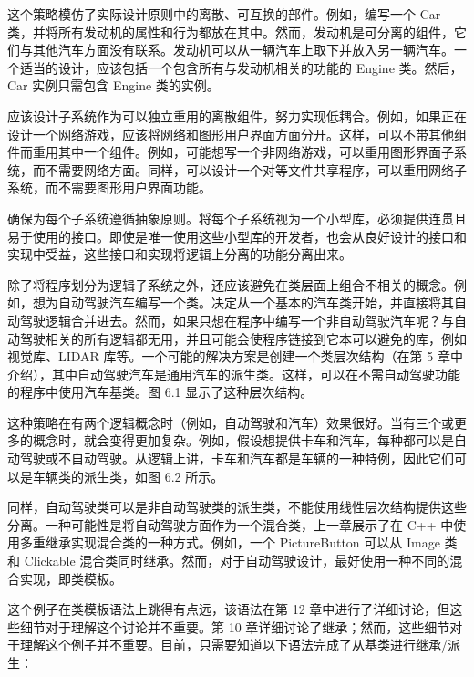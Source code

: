 这个策略模仿了实际设计原则中的离散、可互换的部件。例如，编写一个 Car 类，并将所有发动机的属性和行为都放在其中。然而，发动机是可分离的组件，它们与其他汽车方面没有联系。发动机可以从一辆汽车上取下并放入另一辆汽车。一个适当的设计，应该包括一个包含所有与发动机相关的功能的 Engine 类。然后，Car 实例只需包含 Engine 类的实例。


应该设计子系统作为可以独立重用的离散组件，努力实现低耦合。例如，如果正在设计一个网络游戏，应该将网络和图形用户界面方面分开。这样，可以不带其他组件而重用其中一个组件。例如，可能想写一个非网络游戏，可以重用图形界面子系统，而不需要网络方面。同样，可以设计一个对等文件共享程序，可以重用网络子系统，而不需要图形用户界面功能。

确保为每个子系统遵循抽象原则。将每个子系统视为一个小型库，必须提供连贯且易于使用的接口。即使是唯一使用这些小型库的开发者，也会从良好设计的接口和实现中受益，这些接口和实现将逻辑上分离的功能分离出来。


除了将程序划分为逻辑子系统之外，还应该避免在类层面上组合不相关的概念。例如，想为自动驾驶汽车编写一个类。决定从一个基本的汽车类开始，并直接将其自动驾驶逻辑合并进去。然而，如果只想在程序中编写一个非自动驾驶汽车呢？与自动驾驶相关的所有逻辑都无用，并且可能会使程序链接到它本可以避免的库，例如视觉库、LIDAR 库等。一个可能的解决方案是创建一个类层次结构（在第 5 章中介绍），其中自动驾驶汽车是通用汽车的派生类。这样，可以在不需自动驾驶功能的程序中使用汽车基类。图 6.1 显示了这种层次结构。


这种策略在有两个逻辑概念时（例如，自动驾驶和汽车）效果很好。当有三个或更多的概念时，就会变得更加复杂。例如，假设想提供卡车和汽车，每种都可以是自动驾驶或不自动驾驶。从逻辑上讲，卡车和汽车都是车辆的一种特例，因此它们可以是车辆类的派生类，如图 6.2 所示。


同样，自动驾驶类可以是非自动驾驶类的派生类，不能使用线性层次结构提供这些分离。一种可能性是将自动驾驶方面作为一个混合类，上一章展示了在 C++ 中使用多重继承实现混合类的一种方式。例如，一个 PictureButton 可以从 Image 类和 Clickable 混合类同时继承。然而，对于自动驾驶设计，最好使用一种不同的混合实现，即类模板。

这个例子在类模板语法上跳得有点远，该语法在第 12 章中进行了详细讨论，但这些细节对于理解这个讨论并不重要。第 10 章详细讨论了继承；然而，这些细节对于理解这个例子并不重要。目前，只需要知道以下语法完成了从基类进行继承/派生：

